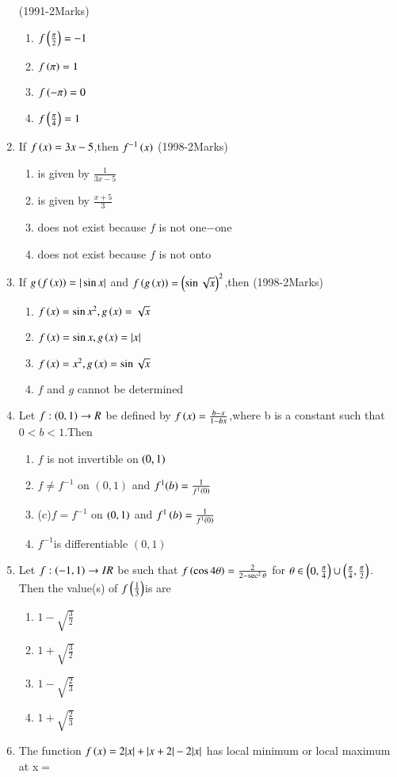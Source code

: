 \documentclass[journal,12pt,twocolumn]{IEEEtran}
\theoremstyle{remark}
\begin{document}
\begin{enumerate}[start=2]
\hfill(1991-2Marks)
\begin{multicols}{2}
\begin{enumerate} 
\item $f\left(\frac{\pi}{2}\right)=-1$
\item $f\left(\pi\right)=1$
\item $f\left(-\pi\right)=0$
\item $f\left(\frac{\pi}{4}\right)=1$
\end{enumerate}
\end{multicols}
\item If $f\left(x\right)=3x-5$,then $f^{-1}\left(x\right)$
\hfill(1998-2Marks)
\begin{enumerate} 
\item is given by $\frac{1}{3x-5}$
\item is given by $\frac{x+5}{3}$
\item does not exist because $f$ is not one$-$one
\item does not exist because $f$ is not onto 
\end{enumerate}
\item If $g\left(f\left(x\right)\right)=|\sin{x}|$ and $f\left(g\left(x\right)\right)=\left(\sin{\sqrt{x}}\right)^2$,then
\hfill(1998-2Marks)
\begin{enumerate} 
\item $f\left(x\right)=\sin{x}^2,g\left(x\right)=\sqrt{x}$
\item $f\left(x\right)=\sin{x},g\left(x\right)=|x|$
\item $f\left(x\right)=x^2,g\left(x\right)=\sin{\sqrt{x}}$
\item $f$ and $g$ cannot be determined
\end{enumerate}
\item Let $f:\left(0,1\right)\rightarrow{R}$ be defined by $f\left(x\right)=\frac{b-x}{1-bx}$,where b is a constant such that $0<b<1$.Then

\begin{enumerate}
\item $f$ is not invertible  on $\left(0,1\right)$
\item$f\neq{f^{-1}}$ on $(0,1)$ and $f^{1}(b)=\frac{1}{f^{1}\left(0\right)}$
\item(c)$f=f^{-1}$ on $\left(0,1\right)$ and $f^{1}\left(b\right)=\frac{1}{f^{1}\left(0\right)}$
\item$f^{-1} $is differentiable $(0,1)$
\end{enumerate}
\item Let $f:\left(-1,1\right)\rightarrow{IR}$ be  such that $f\left(\cos{4\theta}\right) =\frac{2}{2-\sec^2{\theta}}$ for $\theta \in \left(0,\frac{\pi}{4}\right)\cup\left(\frac{\pi}{4},\frac{\pi}{2}\right)$. Then the value(s) of $f\left(\frac{1}{3}\right)$is are
\begin{multicols}{2}
\begin{enumerate} 
\item $1-\sqrt{\frac{3}{2}}$  
\item $1+\sqrt{\frac{3}{2}}$
\item $1-\sqrt{\frac{2}{3}}$   
\item $1+\sqrt{\frac{2}{3}}$
\end{enumerate}
\end{multicols}
\item The function $f\left(x\right)=2|x|+|x+2|-2|x|$ has local minimum or local maximum at x$=$


\end{enumerate}
\end{document}
